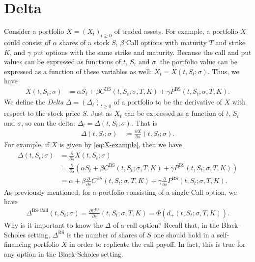\documentclass[12pt]{book}
\numberwithin{equation}{chapter}
\theoremstyle{plain}
\numberwithin{theorem}{section}
\theoremstyle{definition}
\numberwithin{exercise}{chapter}
\newcommand{\<}{\langle}
\renewcommand{\>}{\rangle}
\renewcommand{\(}{\left(}
\renewcommand{\)}{\right)}
\renewcommand{\[}{\left[}
\renewcommand{\]}{\right]}
\newcommand\sig{\sigma}
\newcommand\Del{\Delta}
\renewcommand\d{\partial}
\newcommand\BS{\textrm{BS}}
\theoremstyle{definition}
\numberwithin{question}{section}
\begin{document}
\section{Delta}
Consider a portfolio $X = (X_t)_{t \geq 0}$ of traded assets.  For example, a portfolio $X$ could consist of $\alpha$ shares of a stock $S$, $\beta$ Call options with maturity $T$ and strike $K$, and $\gamma$ put options with the same strike and maturity.  Because the call and put values can be expressed as functions of $t$, $S_t$ and $\sig$, the portfolio value can be expressed as a function of these variables as well: $X_t = X(t,S_t;\sig)$.  Thus, we have
\begin{align}
X(t,S_t;\sig)
	&=	\alpha S_t + \beta C^\BS(t,S_t;\sig,T,K) + \gamma P^\BS(t,S_t;\sig,T,K) . \label{eq:X-example}
\end{align}
We define the \textit{Delta} $\Delta = (\Del_t)_{t \geq 0}$ of a portfolio to be the derivative of $X$ with respect to the stock price $S$.  
Just as $X_t$ can be expressed as a function of $t$, $S_t$ and $\sig$, so can the delta: $\Del_t = \Del(t,S_t;\sig)$.  That is
\begin{align}
\Delta(t,S_t;\sig)
	&:=	\frac{\d X}{\d s}(t,S_t;\sig).
\end{align}
For example, if $X$ is given by \eqref{eq:X-example}, then we have
\begin{align}
\Delta(t,S_t;\sig)
	&=	\frac{\d}{\d s} X(t,S_t;\sig) \\
	&=	\frac{\d}{\d s} \( \alpha S_t + \beta C^\BS(t,S_t;\sig,T,K) + \gamma P^\BS(t,S_t;\sig,T,K) \) \\
	&=	\alpha + \beta \frac{\d}{\d s}C^\BS(t,S_t;\sig,T,K) + \gamma \frac{\d}{\d s} P^\BS(t,S_t;\sig,T,K) .
\end{align}
As previously mentioned, for a portfolio consisting of a single Call option, we have
\begin{align}
\Del^\text{BS-Call}(t,S_t;\sig) = \frac{\d C^\text{BS}}{\d s}(t,S_t;\sig,T,K) = \Phi(d_+(t,S_t;\sig,T,K)) .
\end{align}
Why is it important to know the $\Del$ of a call option?  Recall that, in the Black-Scholes setting, $\Del^\BS$ is the number of shares of $S$ one should hold in a self-financing portfolio $X$ in order to replicate the call payoff.  In fact, this is true for any option in the Black-Scholes setting.
\end{document}
